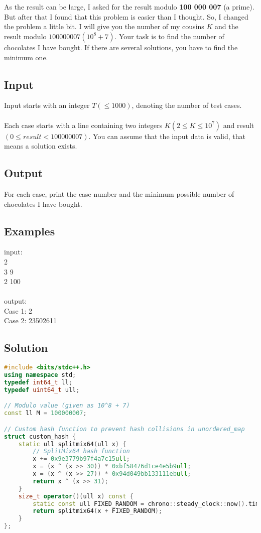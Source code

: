 \documentclass[10pt,a4paper]{article}
\begin{document}
\begin{itemize}
\\ \\
As the result can be large, I asked for the result modulo \textbf{100 000 007} (a prime). But after that I found that this problem is easier than I thought. So, I changed the problem a little bit. I will give you the number of my cousins $K$ and the result modulo $100000007 (10^8 + 7)$. Your task is to find the number of chocolates I have bought. If there are several solutions, you have to find the minimum one.

\subsection*{Input}
Input starts with an integer $T (\leq 1000)$, denoting the number of test cases.
\\ \\
Each case starts with a line containing two integers $K (2 \leq K \leq 10^7)$ and result $(0 \leq result < 100000007)$. You can assume that the input data is valid, that means a solution exists.

\subsection*{Output}
For each case, print the case number and the minimum possible number of chocolates I have bought.

\subsection*{Examples}
input: \\
2 \\
3 9 \\
2 100 \\
\\
output: \\ 
Case 1: 2 \\
Case 2: 23502611

\subsection*{Solution}
\begin{lstlisting}[language=C++, caption={Distributing Chocolates}, label={1st:code}, mathescape=true, breaklines=true]
#include <bits/stdc++.h>
using namespace std;
typedef int64_t ll;
typedef uint64_t ull;

// Modulo value (given as 10^8 + 7)
const ll M = 100000007;

// Custom hash function to prevent hash collisions in unordered_map
struct custom_hash {
    static ull splitmix64(ull x) {
        // SplitMix64 hash function
        x += 0x9e3779b97f4a7c15ull;
        x = (x ^ (x >> 30)) * 0xbf58476d1ce4e5b9ull;
        x = (x ^ (x >> 27)) * 0x94d049bb133111ebull;
        return x ^ (x >> 31);
    }
    size_t operator()(ull x) const {
        static const ull FIXED_RANDOM = chrono::steady_clock::now().time_since_epoch().count();
        return splitmix64(x + FIXED_RANDOM);
    }
};


\end{lstlisting}
\end{itemize}
\end{document}

